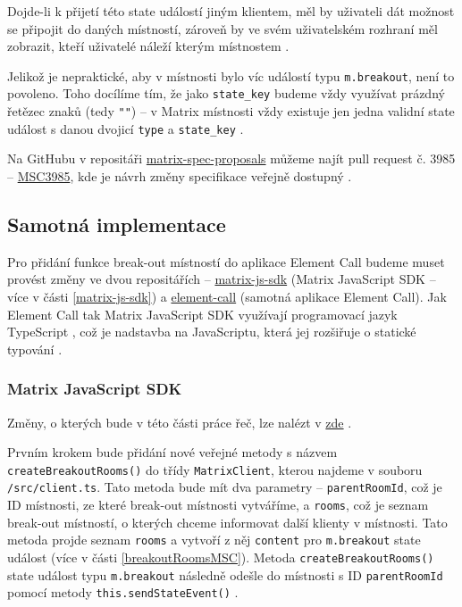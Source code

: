 Dojde-li k přijetí této state událostí jiným klientem, měl by uživateli dát
možnost se připojit do daných místností, zároveň by ve svém uživatelském rozhraní
měl zobrazit, kteří uživatelé náleží kterým místnostem \parencite{GitHub-MSC3985}.

Jelikož je nepraktické, aby v místnosti bylo víc událostí typu
\texttt{m.breakout}, není to povoleno. Toho docílíme tím, že jako
\texttt{state_key} budeme vždy využívat prázdný řetězec znaků (tedy
\texttt{""}) \parencite{GitHub-MSC3985} -- v Matrix místnosti vždy existuje
jen jedna validní state událost s danou dvojicí \texttt{type} a
\texttt{state_key} \parencite{MatrixORG-Spec}.

Na GitHubu v repositáři
\href{https://github.com/matrix-org/matrix-spec-proposals}{matrix-spec-proposals}
můžeme najít pull request č. 3985 --
\href{https://github.com/matrix-org/matrix-spec-proposals/pull/3985}{MSC3985},
kde je návrh změny specifikace veřejně dostupný \parencite{GitHub-MSC3985}.

\subsection{Samotná implementace}

Pro přidání funkce break-out místností do aplikace Element Call budeme muset
provést změny ve dvou repositářích --
\href{https://github.com/matrix-org/matrix-js-sdk/}{matrix-js-sdk} (Matrix
JavaScript SDK -- více v části \ref{matrix-js-sdk}) a
\href{https://github.com/vector-im/element-call/}{element-call} (samotná
aplikace Element Call). Jak Element Call tak Matrix JavaScript SDK využívají
programovací jazyk TypeScript \parencite{GitHub-MatrixJSSDK, GitHub-ElementCall}, což
je nadstavba na JavaScriptu, která jej rozšiřuje o statické typování
\parencite{TypeScript-Homepage}.

\subsubsection{Matrix JavaScript SDK}

Změny, o kterých bude v této části práce řeč, lze nalézt v
\href{https://github.com/matrix-org/matrix-js-sdk/pull/3753/}{zde}
\parencite{GitHub-MatrixJSSDK-BreakoutRooms}.

Prvním krokem bude přidání nové veřejné metody s názvem
\texttt{createBreakoutRooms()} do třídy
\texttt{MatrixClient}, kterou najdeme v souboru
\texttt{/src/client.ts}. Tato metoda bude mít dva parametry --
\texttt{parentRoomId}, což je ID místnosti, ze které break-out
místnosti vytváříme, a \texttt{rooms}, což je seznam break-out
místností, o kterých chceme informovat další klienty v místnosti. Tato metoda
projde seznam \texttt{rooms} a vytvoří z něj
\texttt{content} pro \texttt{m.breakout} state událost (více
v části \ref{breakoutRoomsMSC}). Metoda
\texttt{createBreakoutRooms()} state událost typu
\texttt{m.breakout} následně odešle do místnosti s ID
\texttt{parentRoomId} pomocí metody
\texttt{this.sendStateEvent()}
\parencite{GitHub-MatrixJSSDK-BreakoutRooms}.


